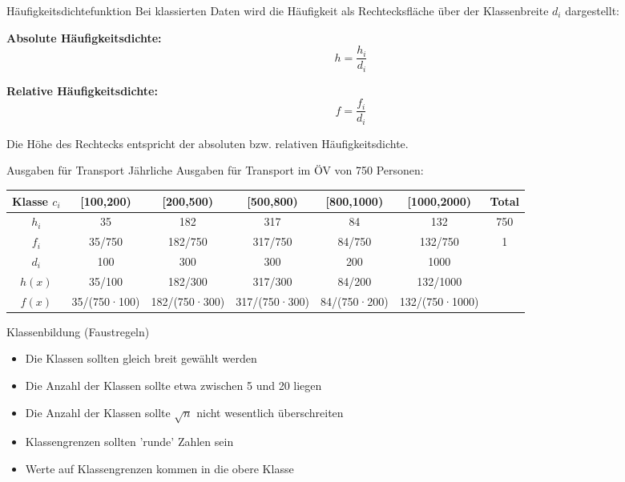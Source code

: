 \begin{concept}{Häufigkeitsdichtefunktion}
Bei klassierten Daten wird die Häufigkeit als Rechtecksfläche über der Klassenbreite $d_i$ dargestellt:

\textbf{Absolute Häufigkeitsdichte:}
$$h = \frac{h_i}{d_i}$$

\textbf{Relative Häufigkeitsdichte:}
$$f = \frac{f_i}{d_i}$$

Die Höhe des Rechtecks entspricht der absoluten bzw. relativen Häufigkeitsdichte.
\end{concept}

\begin{example2}{Ausgaben für Transport}
Jährliche Ausgaben für Transport im ÖV von 750 Personen:

\begin{center}
\begin{tabular}{|c|c|c|c|c|c|c|}
\hline
Klasse $c_i$ & [100,200) & [200,500) & [500,800) & [800,1000) & [1000,2000) & Total \\
\hline
$h_i$ & 35 & 182 & 317 & 84 & 132 & 750 \\
\hline
$f_i$ & 35/750 & 182/750 & 317/750 & 84/750 & 132/750 & 1 \\
\hline
$d_i$ & 100 & 300 & 300 & 200 & 1000 & \\
\hline
$h(x)$ & 35/100 & 182/300 & 317/300 & 84/200 & 132/1000 & \\
\hline
$f(x)$ & 35/(750·100) & 182/(750·300) & 317/(750·300) & 84/(750·200) & 132/(750·1000) & \\
\hline
\end{tabular}
\end{center}
\end{example2}

\begin{KR}{Klassenbildung (Faustregeln)}
\begin{itemize}
    \item Die Klassen sollten gleich breit gewählt werden
    \item Die Anzahl der Klassen sollte etwa zwischen 5 und 20 liegen
    \item Die Anzahl der Klassen sollte $\sqrt{n}$ nicht wesentlich überschreiten
    \item Klassengrenzen sollten 'runde' Zahlen sein
    \item Werte auf Klassengrenzen kommen in die obere Klasse
\end{itemize}
\end{KR}

